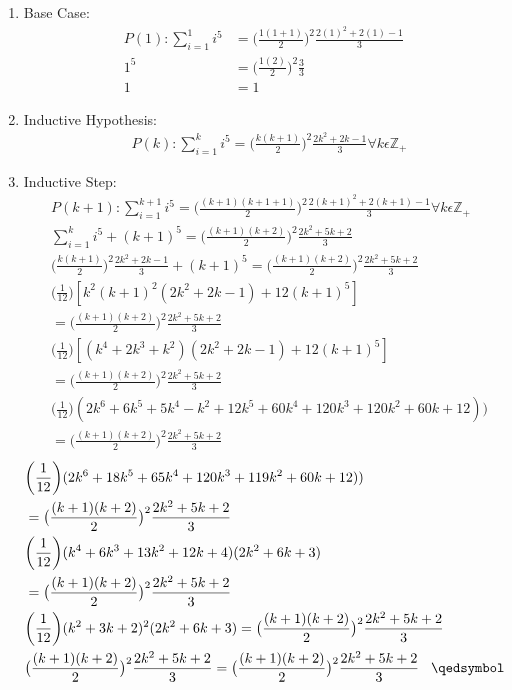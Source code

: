 \documentclass[12pt]{article}
\begin{document}
\begin{enumerate}
\item Base Case:\\
\begin{align*}
P(1):\sum\limits_{i = 1}^{1} i^5 &= \big(\frac{1(1 + 1)}{2}\big)^2\frac{2(1)^2+2(1)-1}{3}\\
1^5 &= \big(\frac{1(2)}{2}\big)^2\frac{3}{3}\\
1 &= 1
\end{align*}

\item Inductive Hypothesis:
\begin{align*}
&P(k):\sum\limits_{i = 1}^{k} i^5 = \big(\frac{k(k + 1)}{2}\big)^2\frac{2k^2+2k-1}{3} \forall k \epsilon \mathbb{Z}_+
\end{align*}
\item Inductive Step:
\begin{align*}
&P(k+1):\sum\limits_{i = 1}^{k+1} i^5 = \big(\frac{(k+1)(k + 1 + 1)}{2}\big)^2\frac{2(k+1)^2+2(k+1)-1}{3} \forall k \epsilon \mathbb{Z}_+ \\
&\sum\limits_{i = 1}^{k} i^5 + (k + 1)^5 = \big(\frac{(k+1)(k + 2)}{2}\big)^2\frac{2k^2+5k+2}{3}\\
&\bigg(\frac{k(k + 1)}{2}\bigg)^2\frac{2k^2+2k-1}{3} + (k + 1)^5 = \big(\frac{(k+1)(k + 2)}{2}\big)^2\frac{2k^2+5k+2}{3}\\
&\bigg(\frac{1}{12}\bigg)[k^2(k+1)^2(2k^2+2k-1)+12(k+1)^5] \\&= \big(\frac{(k+1)(k + 2)}{2}\big)^2\frac{2k^2+5k+2}{3}\\
&\bigg(\frac{1}{12}\bigg)[(k^4+2k^3+k^2)(2k^2+2k-1)+12(k+1)^5]\\&= \big(\frac{(k+1)(k + 2)}{2}\big)^2\frac{2k^2+5k+2}{3}\\
&\bigg(\frac{1}{12}\bigg)(2k^6+6k^5+5k^4-k^2+12k^5+60k^4+120k^3+120k^2+60k+12))\\&= \big(\frac{(k+1)(k + 2)}{2}\big)^2\frac{2k^2+5k+2}{3}
\end{align*}
\begin{align*}
&\bigg(\frac{1}{12}\bigg)(2k^6+18k^5+65k^4+120k^3+119k^2+60k+12))\\&= \big(\frac{(k+1)(k + 2)}{2}\big)^2\frac{2k^2+5k+2}{3}\\
&\bigg(\frac{1}{12}\bigg)(k^4+6k^3+13k^2+12k+4)(2k^2+6k+3)\\&= \big(\frac{(k+1)(k + 2)}{2}\big)^2\frac{2k^2+5k+2}{3}\\
&\bigg(\frac{1}{12}\bigg)(k^2+3k+2)^2(2k^2+6k+3)= \big(\frac{(k+1)(k + 2)}{2}\big)^2\frac{2k^2+5k+2}{3}\\
&\big(\frac{(k+1)(k + 2)}{2}\big)^2\frac{2k^2+5k+2}{3}= \big(\frac{(k+1)(k + 2)}{2}\big)^2\frac{2k^2+5k+2}{3}\hspace{0.3cm}\qedsymbol
\end{align*}
\end{enumerate}
\end{document}
